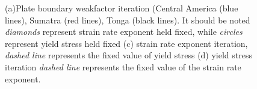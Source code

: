 \documentclass[12pt]{article}
\begin{document}
\begin{figure}[H]
\centering
\hspace{-0.4cm}
\hspace{-0.1cm}
\hspace{-0.2cm}
\hspace{-0.2cm}
\caption{(a)Plate boundary weakfactor iteration (Central America (blue lines), Sumatra (red lines), Tonga (black lines). It should be noted \textit{diamonds} represent strain rate exponent held fixed, while \textit{circles} represent yield stress held fixed (c) strain rate exponent iteration, \textit{dashed line} represents the fixed value of yield stress (d) yield stress iteration \textit{dashed line} represents the fixed value of the strain rate exponent.}
\label{fig:inverse1}
\end{figure}
\end{document}
